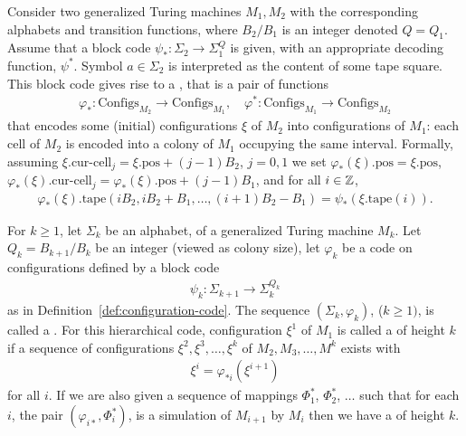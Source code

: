 \documentclass[11pt]{memoir}
\theoremstyle{definition} %
\renewcommand{\ge}{\geq}
\def\B{B}
\newcommand{\Configs}{\mathrm{Configs}}
\newcommand{\pos}{\mathrm{pos}}
\newcommand{\curcell}{\textrm{cur-cell}}
\newcommand{\Q}{Q} %
\newcommand{\tape}{\mathrm{tape}}
\begin{document}
\begin{definition}\label{def:configuration-code}
\begin{sloppypar}
 Consider two generalized Turing machines \( M_{1},M_{2} \) with the corresponding
alphabets and transition functions, where \( \B_{2}/\B_{1} \) is an integer denoted \( \Q=\Q_{1} \).
Assume that a block code
\(
   \psi_{*}:\Sigma_{2}\to\Sigma_{1}^{\Q}
\)
is given, with an appropriate decoding function, \( \psi^{*} \).
Symbol \( a\in\Sigma_{2} \) is interpreted as the content of some tape square.
This block code gives rise to a , that is a pair of functions
    \begin{align*}
        \varphi_{*} :\Configs_{M_{2}} \to \Configs_{M_{1}},
        \quad
        \varphi^{*}:\Configs_{M_{1}} \to \Configs_{M_{2}}
    \end{align*}
    that encodes some (initial) configurations \( \xi \) of \( M_{2} \) into configurations of \( M_{1} \):
    each cell of \( M_{2} \) is encoded into a colony of \( M_{1} \) occupying the same interval.
    Formally, assuming \( \xi.\curcell_{j}=\xi.\pos+(j-1)\B_{2} \), \( j=0,1 \) 
    we set \( \varphi_{*}(\xi).\pos = \xi.\pos \),
    \( \varphi_{*}(\xi).\curcell_{j}= \varphi_{*}(\xi).\pos+(j-1)\B_{1} \),
  and for all \( i\in\mathbb{Z} \),
\begin{align*}
 \varphi_{*}(\xi).\tape(i\B_{2},i\B_{2}+\B_{1}, \dots, (i+1)\B_{2} - \B_{1}) = \psi_{*}(\xi.\tape(i)).
 \end{align*}
\end{sloppypar}
 \end{definition}


\begin{definition}\label{def:hierarchical-code}
For \( k\ge 1 \), let \( \Sigma_{k} \) be an alphabet, of a generalized Turing machine \( M_{k} \).
Let \( \Q_{k}=\B_{k+1}/\B_{k} \) be an integer (viewed as colony size), let \( \varphi_{k} \)
be a code on configurations defined by a block code
  \begin{align*}
       \psi_{k}: \Sigma_{k+1}\to \Sigma_{k}^{\Q_{k}}
  \end{align*}
as in Definition~\ref{def:configuration-code}.
The sequence \( (\Sigma_{k},\varphi_{k}) \), (\( k\ge 1) \),  is
called a .
For this hierarchical code, configuration \( \xi^{1} \) of \( M_{1} \)
is called a  of height \( k \) if a sequence
of configurations \( \xi^{2},\xi^{3},\dots,\xi^{k} \) of \( M_{2},M_{3},\dots,M^{k} \) exists with
\begin{align*}
 \xi^{i}=\varphi_{*i}(\xi^{i+1})
 \end{align*} 
for all \( i \).
If we are also given a sequence of mappings \( \Phi^{*}_{1} \), \( \Phi^{*}_{2} \), \( \dots \) 
such that for each \( i \), the pair \( (\varphi_{i*},\Phi_{i}^{*}) \),
is a simulation of \( M_{i+1} \) by \( M_{i} \) 
then we have a  of height \( k \).
\end{definition}
\end{document}
